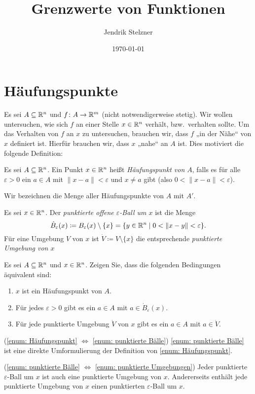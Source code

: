 \documentclass[a4paper,10pt]{article}
\title{Grenzwerte von Funktionen}
\author{Jendrik Stelzner}
\date{\today}
\begin{document}
\maketitle

\tableofcontents





\section{Häufungspunkte}


Es sei $A \subseteq \mathbb{R}^n$ und $f \colon A \to \mathbb{R}^m$ (nicht notwendigerweise stetig). Wir wollen untersuchen, wie sich $f$ an einer Stelle $x \in \mathbb{R}^n$ verhält, bzw.\ verhalten sollte. Um das Verhalten von $f$ an $x$ zu untersuchen, brauchen wir, dass $f$ „in der Nähe“ von $x$ definiert ist. Hierfür brauchen wir, dass $x$ „nahe“ an $A$ ist. Dies motiviert die folgende Definition:


\begin{defi}
 Es sei $A \subseteq \mathbb{R}^n$. Ein Punkt $x \in \mathbb{R}^n$ heißt \emph{Häufungspunkt von $A$}, falls es für alle $\varepsilon > 0$ ein $a \in A$ mit $\|x-a\| < \varepsilon$ und $x \neq a$ gibt (also $0 < \|x-a\| < \varepsilon$).
 
 Wir bezeichnen die Menge aller Häufungspunkte von $A$ mit $A'$.
\end{defi}


\begin{question}
 Es sei $x \in \mathbb{R}^n$. Der \emph{punktierte offene $\varepsilon$-Ball um $x$} ist die Menge
 \[
  \dot{B}_\varepsilon(x)
  \coloneqq B_\varepsilon(x) \setminus \{x\}
  = \{y \in \mathbb{R}^n \mid 0 < \|x-y\| < \varepsilon\}.
 \]
 Für eine Umgebung $V$ von $x$ ist $\dot{V} \coloneqq V \setminus \{x\}$ die entsprechende \emph{punktierte Umgebung von $x$}
 
 Es sei $A \subseteq \mathbb{R}^n$ und $x \in \mathbb{R}^n$. Zeigen Sie, dass die folgenden Bedingungen äquivalent sind:
 \begin{enumerate}
  \item\label{enum: Häufungspunkt}
   $x$ ist ein Häufungspunkt von $A$.
  \item\label{enum: punktierte Bälle}
   Für jedes $\varepsilon > 0$ gibt es ein $a \in A$ mit $a \in \dot{B}_\varepsilon(x)$.
  \item\label{enum: punktierte Umgebungen}
   Für jede punktierte Umgebung $\dot{V}$ von $x$ gibt es ein $a \in A$ mit $a \in \dot{V}$.
 \end{enumerate}
\end{question}
\begin{solution}
 (\ref{enum: Häufungspunkt} $\Leftrightarrow$ \ref{enum: punktierte Bälle}) \ref{enum: punktierte Bälle} ist eine direkte Umformulierung der Definition von \ref{enum: Häufungspunkt}.
 
 (\ref{enum: punktierte Bälle} $\Leftrightarrow$ \ref{enum: punktierte Umgebungen}) Jeder punktierte $\varepsilon$-Ball um $x$ ist auch eine punktierte Umgebung von $x$. Andererseits enthält jede punktierte Umgebung von $x$ einen punktierten $\varepsilon$-Ball um $x$.
\end{solution}
\end{document}
